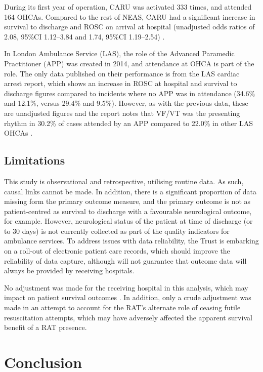 \documentclass[]{article}
\theoremstyle{definition}
\theoremstyle{definition}
\theoremstyle{definition}
\theoremstyle{remark}
\begin{document}
During its first year of operation, CARU was activated 333 times, and
attended 164 OHCAs. Compared to the rest of NEAS, CARU had a significant
increase in survival to discharge and ROSC on arrival at hospital
(unadjusted odds ratios of 2.08, 95\%CI 1.12--3.84 and 1.74, 95\%CI
1.19--2.54) \citep{mcclelland_service_2016}.

In London Ambulance Service (LAS), the role of the Advanced Paramedic
Practitioner (APP) was created in 2014, and attendance at OHCA is part
of the role. The only data published on their performance is from the
LAS cardiac arrest report, which shows an increase in ROSC at hospital
and survival to discharge figures compared to incidents where no APP was
in attendance (34.6\% and 12.1\%, versus 29.4\% and 9.5\%). However, as
with the previous data, these are unadjusted figures and the report
notes that VF/VT was the presenting rhythm in 30.2\% of cases attended
by an APP compared to 22.0\% in other LAS OHCAs
\citep{london_ambulance_service_nhs_trust_cardiac_2017}.

\hypertarget{limitations}{%
\subsection{Limitations}\label{limitations}}

This study is observational and retrospective, utilising routine data.
As such, causal links cannot be made. In addition, there is a
significant proportion of data missing form the primary outcome measure,
and the primary outcome is not as patient-centred as survival to
discharge with a favourable neurological outcome, for example. However,
neurological status of the patient at time of discharge (or to 30 days)
is not currently collected as part of the quality indicators for
ambulance services. To address issues with data reliability, the Trust
is embarking on a roll-out of electronic patient care records, which
should improve the reliability of data capture, although will not
guarantee that outcome data will always be provided by receiving
hospitals.

No adjustment was made for the receiving hospital in this analysis,
which may impact on patient survival outcomes
\citep{stub_hospital_2011, stub_hospital_2015}. In addition, only a
crude adjustment was made in an attempt to account for the RAT's
alternate role of ceasing futile resuscitation attempts, which may have
adversely affected the apparent survival benefit of a RAT presence.

\hypertarget{conclusion-1}{%
\section{Conclusion}\label{conclusion-1}}
\end{document}
